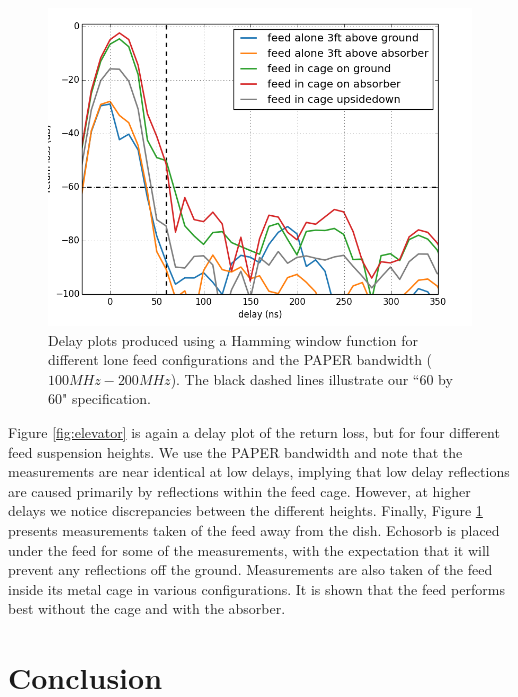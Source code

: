 \documentclass[12pt,preprint]{aastex}
\begin{document}
\begin{figure}[H]
\centering
\includegraphics[totalheight=0.4\textheight]{plots/delay_feed.png}
\caption{Delay plots produced using a Hamming window function for different lone feed configurations and the PAPER bandwidth ($100MHz-200MHz$). The black dashed lines illustrate our ``60 by 60" specification.}
\label{fig:outofthedish}
\end{figure}
Figure \ref{fig:elevator} is again a delay plot of the return loss, but for
four different feed suspension heights. We use the PAPER bandwidth and note
that the measurements are near identical at low delays, implying that low delay
reflections are caused primarily by reflections within the feed cage. However,
at higher delays we notice discrepancies between the different heights.
Finally, Figure \ref{fig:outofthedish} presents measurements taken of the feed
away from the dish. Echosorb is placed under the feed for some of the
measurements, with the expectation that it will prevent any reflections off the
ground. Measurements are also taken of the feed inside its metal cage in
various configurations. It is shown that the feed performs best without the cage and with the absorber. 


\section{Conclusion}
\end{document}
